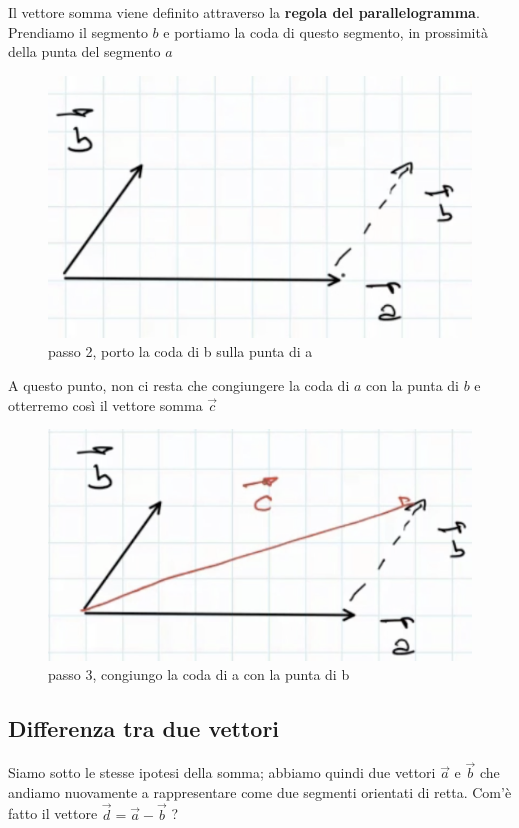 \documentclass[a4paper]{book}
\begin{document}
Il vettore somma viene definito attraverso la \textbf{regola del parallelogramma}. Prendiamo il segmento $b$ e portiamo la coda di questo segmento, in prossimità della punta del segmento $a$

\begin{figure}[h]
\begin{center}
\includegraphics[width = 0.5 \textwidth]{somma2}
\caption{passo 2, porto la coda di b sulla punta di a}
\label{fig:somma2}
\end{center}
\end{figure}

A questo punto, non ci resta che congiungere la coda di $a$ con la punta di $b$ e otterremo così il vettore somma $\overrightarrow{c}$

\begin{figure}[h]
\begin{center}
\includegraphics[width = 0.5 \textwidth]{somma3}
\caption{passo 3, congiungo la coda di a con la punta di b}
\label{fig:somma3}
\end{center}
\end{figure}

\subsection{Differenza tra due vettori}
Siamo sotto le stesse ipotesi della somma; abbiamo quindi due vettori 
$\overrightarrow{a} $ e $\overrightarrow{b} $ che andiamo nuovamente a rappresentare come due segmenti orientati di retta. Com'è fatto il vettore 
$ \overrightarrow{d} = \overrightarrow{a} - \overrightarrow{b} $ ? 
\end{document}
